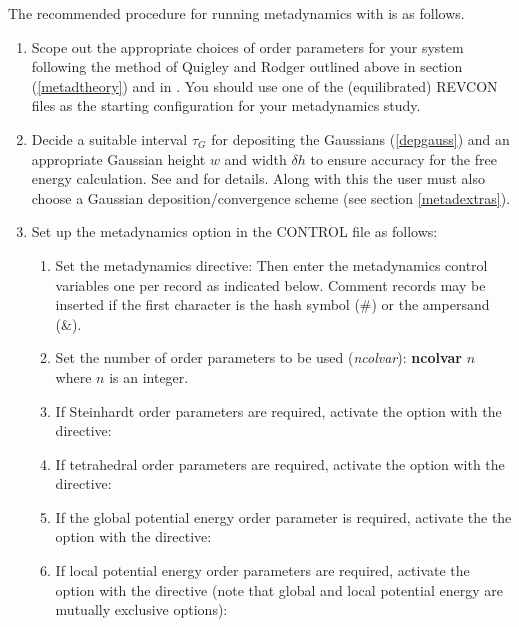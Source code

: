 The recommended procedure for running metadynamics with \D{} is as follows.
\begin{enumerate}
\item Scope out the appropriate choices of order parameters for your system
  following the method of Quigley and Rodger outlined above in section
  (\ref{metadtheory}) and in \cite{quigley-09a}. You should use one of the
  (equilibrated) REVCON files as the starting configuration for your
  metadynamics study.
\item Decide a suitable interval $\tau_{G}$ for depositing the Gaussians
  (\ref{depgauss}) and an appropriate Gaussian height $w$ and width $\delta h$
  to ensure accuracy for the free energy calculation. See \cite{laio-05a} and 
  \cite{quigley-09a} for details. Along with this the user must also choose a
  Gaussian deposition/convergence scheme (see section \ref{metadextras}).
\item Set up the metadynamics option in the CONTROL file as follows:
\begin{enumerate}
\item Set the metadynamics directive: \newline Then
  enter the metadynamics control variables one per record as indicated below.
  Comment records may be inserted if the first character is the hash symbol
  (\#) or the ampersand (\&).
\item Set the number of order parameters to be used ({\em ncolvar}):\newline
  {\bf ncolvar} $n$ \newline where $n$ is an integer.
\item If Steinhardt order parameters are required, activate the option with
  the directive: 
\item If tetrahedral order parameters are required, activate the option with
  the directive: 
\item If the global potential energy order parameter is required, activate the
  the option with the directive: 
\item If local potential energy order parameters are required, activate the
  option with the directive (note that global and local potential energy are
  mutually exclusive options): 

\end{enumerate}
\end{enumerate}
